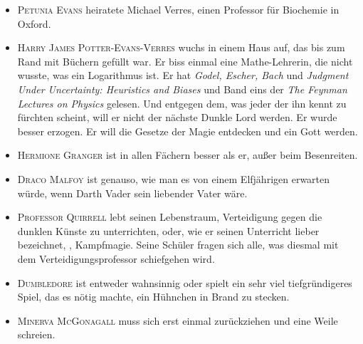 \begin{itemize}
\item \textsc{Petunia Evans} heiratete Michael Verres, einen Professor für Biochemie in Oxford.
\item \textsc{Harry James Potter-Evans-Verres} wuchs in einem Haus auf, das bis zum Rand mit Büchern gefüllt war. Er biss einmal eine Mathe-Lehrerin, die nicht wusste, was ein Logarithmus ist. Er hat \emph{Godel, Escher, Bach} und \emph{Judgment Under Uncertainty: Heuristics and Biases} und Band eins der \emph{The Feynman Lectures on Physics} gelesen. Und entgegen dem, was jeder der ihn kennt zu fürchten scheint, will er nicht der nächste Dunkle Lord werden. Er wurde besser erzogen. Er will die Gesetze der Magie entdecken und ein Gott werden.
\item \textsc{Hermione Granger} ist in allen Fächern besser als er, außer beim Besenreiten.
\item \textsc{Draco Malfoy} ist genauso, wie man es von einem Elfjährigen erwarten würde, wenn Darth Vader sein liebender Vater wäre.
\item \textsc{Professor Quirrell} lebt seinen Lebenstraum, Verteidigung gegen die dunklen Künste zu unterrichten, oder, wie er seinen Unterricht lieber bezeichnet, , Kampfmagie. Seine Schüler fragen sich alle, was diesmal mit dem Verteidigungsprofessor schiefgehen wird.
\item \textsc{Dumbledore} ist entweder wahnsinnig oder spielt ein sehr viel tiefgründigeres Spiel, das es nötig machte, ein Hühnchen in Brand zu stecken.
\item \textsc{Minerva McGonagall} muss sich erst einmal zurückziehen und eine Weile schreien.
\end{itemize}

